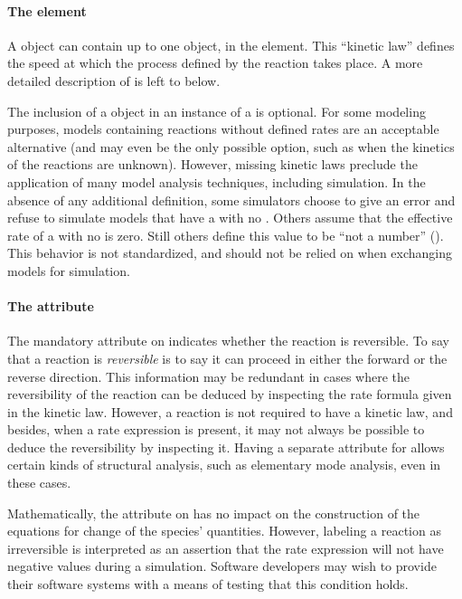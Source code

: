\paragraph{The  element}

A \Reaction object can contain up to one \KineticLaw object, in
the  element.  This ``kinetic law'' defines the
speed at which the process defined by the reaction takes place.  A
more detailed description of \KineticLaw is left to
 below.

The inclusion of a \KineticLaw object in an instance of a
\Reaction is optional.  For some modeling purposes, models
containing reactions without defined rates are an acceptable
alternative (and may even be the only possible option, such as
when the kinetics of the reactions are unknown).  However, missing
kinetic laws preclude the application of many model analysis
techniques, including simulation.  In the absence of any additional definition, some simulators choose to give an error and refuse to simulate models that have a \Reaction with no \KineticLaw.  Others assume that the effective rate of a \Reaction with no \KineticLaw is zero.  Still others define this value to be ``not a number'' ().  This behavior is not standardized, and should not be relied on when exchanging models for simulation.


\paragraph{The  attribute}
\label{sec:reversible}

The mandatory  attribute  on \Reaction
indicates whether the reaction is reversible.  To say that a
reaction is \emph{reversible} is to say it can proceed in either
the forward or the reverse direction.  This information may be
redundant in cases where the reversibility of the reaction can be
deduced by inspecting the rate formula given in the kinetic law.
However, a reaction is not required to have a kinetic law, and
besides, when a rate expression is present, it may not always be
possible to deduce the reversibility by inspecting it.  Having a
separate attribute for  allows certain kinds of
structural analysis, such as elementary mode analysis, even in
these cases.

Mathematically, the  attribute on \Reaction has
no impact on the construction of the equations for change of the
species' quantities.  However, labeling a reaction as irreversible
is interpreted as an assertion that the rate expression will not
have negative values during a simulation.  Software developers may
wish to provide their software systems with a means of testing
that this condition holds.

